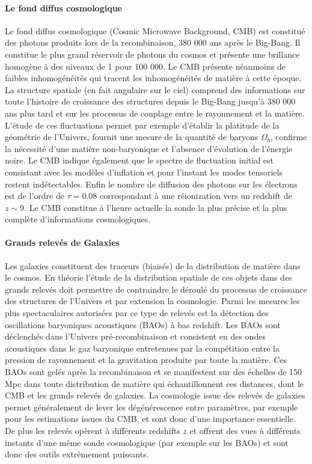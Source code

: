 \paragraph{Le fond diffus cosmologique}
Le fond diffus cosmologique (Cosmic Microwave Background, CMB) est constitué des photons produits lors de la recombinaison, 380 000 ans après le Big-Bang. Il constitue le plus grand réservoir de photons du cosmos et présente une brillance homogène à des niveaux de 1 pour 100 000. Le CMB présente néanmoins de faibles inhomogénéités qui tracent les inhomogénéités de matière à cette époque. La structure spatiale (en fait angulaire sur le ciel) comprend des informations sur toute l'histoire de croissance des structures depuis le Big-Bang jusqu'à 380 000 ans plus tard et sur les processus de couplage entre le rayonnement et la matière. L'étude de ces fluctuations permet par exemple d'établir la platitude de la géométrie de l'Univers, fournit une mesure de la quantité de baryons $\Omega_b$, confirme la nécessité d'une matière non-baryonique et l'absence d'évolution de l'énergie noire. Le CMB indique également que le spectre de fluctuation initial est consistant avec les modèles d'inflation et pour l'instant les modes tensoriels restent indétectables. Enfin le nombre de diffusion des photons sur les électrons est de l'ordre de $\tau=0.08$ correspondant à une réionization vers un redshift de $z\sim9$. Le CMB constitue à l'heure actuelle la sonde la plus précise et la plus complète d'informations cosmologiques.

\paragraph{Grands relevés de Galaxies}
Les galaxies constituent des traceurs (biaisés) de la distribution de matière dans le cosmos. En théorie l'étude de la distribution spatiale de ces objets dans des grands relevés doit permettre de contraindre le déroulé du processus de croissance des structures de l'Univers et par extension la cosmologie. Parmi les mesures les plus spectaculaires autorisées par ce type de relevés est la détection des oscillations baryoniques acoustiques (BAOs) à bas redshift. Les BAOs sont déclenchés dans l'Univers pré-recombinaison et consistent en des ondes acoustiques dans le gaz baryonique entretenues par la compétition entre la pression de rayonnement et la gravitation produite par toute la matière. Ces BAOs sont gelés après la recombinaison et se manifestent sur des échelles de 150 Mpc dans toute distribution de matière qui échantillonnent ces distances, dont le CMB et les grands relevés de galaxies.  La cosmologie issue des relevés de galaxies permet généralement de lever les dégénérescence entre paramètres, par exemple pour les estimations issues du CMB, et sont donc d'une importance essentielle. De plus les relevés opèrent à différents redshifts $z$ et offrent  des vues à différents instants d'une même sonde cosmologique (par exemple sur les BAOs) et sont donc des outils extrêmement puissants.

